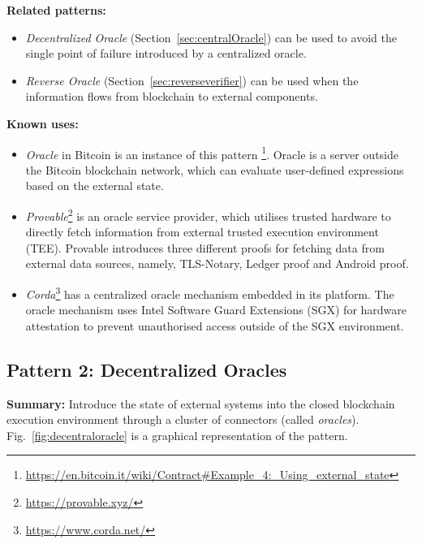 \vspace{0.5em}\noindent \textbf{Related patterns:} 
\begin{itemize}
    \item \textit{Decentralized Oracle} (Section~\ref{sec:centralOracle}) can be used to avoid the single point of failure introduced by a centralized oracle.
    \item \textit{Reverse Oracle} (Section~\ref{sec:reverseverifier}) can be used when the information flows from blockchain to external components.
\end{itemize}

\vspace{0.5em}\noindent \textbf{Known uses:}
\begin{itemize}
  \item \emph{Oracle} in Bitcoin is an instance of this pattern \footnote{\url{https://en.bitcoin.it/wiki/Contract\#Example_4:_Using_external_state}}. Oracle is a server outside the Bitcoin blockchain network, which can evaluate user-defined expressions based on the external state.
  \item \emph{Provable}\footnote{\label{note}\url{https://provable.xyz/}} is an oracle service provider, which utilises trusted hardware to directly fetch information from external trusted execution environment (TEE). Provable introduces three different proofs for fetching data from external data sources, namely, TLS-Notary, Ledger proof and Android proof.
  \item \emph{Corda}\footnote{\label{corda}\url{https://www.corda.net/}} has a centralized oracle mechanism embedded in its platform. The oracle mechanism uses Intel Software Guard Extensions (SGX) for hardware attestation to prevent unauthorised access outside of the SGX environment.
\end{itemize}



\subsection{\textbf{Pattern 2: Decentralized Oracles}}
\label{sec:decentralOracle}

\noindent \textbf{Summary:} Introduce the state of external systems into the closed blockchain execution environment through a cluster of connectors (called \textit{oracles}). Fig.~\ref{fig:decentraloracle} is a graphical representation of the pattern.

